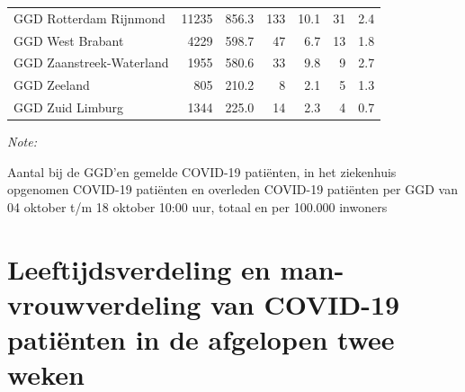 \documentclass[
  english,
  man,floatsintext]{apa6}
\begin{document}
\begin{table}[H]
\begin{threeparttable}
\begin{tabular}{lrrrrrr}
GGD Rotterdam Rijnmond & 11235 & 856.3 & 133 & 10.1 & 31 & 2.4\\
GGD West Brabant & 4229 & 598.7 & 47 & 6.7 & 13 & 1.8\\
GGD Zaanstreek-Waterland & 1955 & 580.6 & 33 & 9.8 & 9 & 2.7\\
GGD Zeeland & 805 & 210.2 & 8 & 2.1 & 5 & 1.3\\
GGD Zuid Limburg & 1344 & 225.0 & 14 & 2.3 & 4 & 0.7\\
\bottomrule
\end{tabular}
\begin{tablenotes}
\item \textit{Note: } 
\item Aantal bij de GGD’en gemelde COVID-19 patiënten, in het ziekenhuis opgenomen COVID-19 patiënten en overleden COVID-19 patiënten per GGD van 04 oktober t/m 18 oktober 10:00 uur, totaal en per 100.000 inwoners
\end{tablenotes}
\end{threeparttable}
\endgroup{}
\end{table}

\newpage

\hypertarget{leeftijdsverdeling-en-man-vrouwverdeling-van-covid-19-patiuxebnten-in-de-afgelopen-twee-weken}{%
\section{Leeftijdsverdeling en man-vrouwverdeling van COVID-19 patiënten in de afgelopen twee weken}\label{leeftijdsverdeling-en-man-vrouwverdeling-van-covid-19-patiuxebnten-in-de-afgelopen-twee-weken}}
\end{document}
